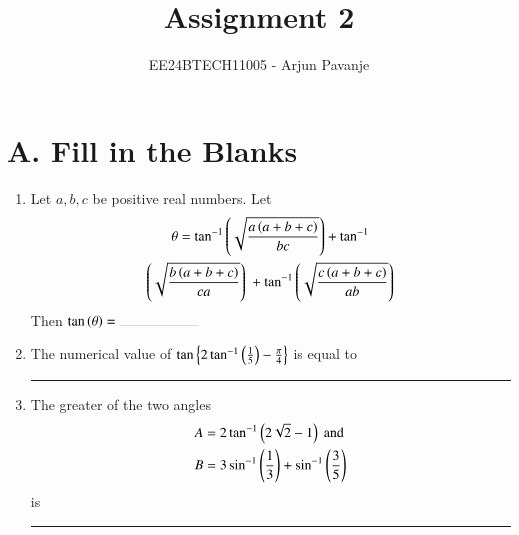 \documentclass[journal,12pt,twocolumn,article]{IEEEtran}
\theoremstyle{remark}
\begin{document}

\vspace{3cm}

\title{Assignment 2}
\author{EE24BTECH11005 - Arjun Pavanje}
\maketitle
\newpage
\bigskip

\renewcommand{\thefigure}{\theenumi}
\renewcommand{\thetable}{\theenumi}
\section*{A. Fill in the Blanks}
\begin{enumerate}
\item Let $a,b,c$ be positive real numbers. Let
\begin{multline*}
	\theta = \tan ^{-1}\left(\sqrt{\frac{a\left(a+b+c\right)}{bc}}\right) + \tan ^{-1}\\\left(\sqrt{\frac{b\left(a+b+c\right)}{ca}}\right)\ + \tan ^{-1}\left(\sqrt{\frac{c\left(a+b+c\right)}{ab}}\right) 
\end{multline*}
Then $\tan \brak{\theta}= \rule{2cm}{0.1pt}$ 
\hfill {}
\item The numerical value of $\tan \left\{ 2\tan ^{-1}\left(\frac{1}{5}\right)-\frac{\pi}{4}\right\}$ is equal to \rule{2cm}{0.1pt}
\hfill {}
\item The greater of the two angles 
\begin{align*}
A &= 2 \tan ^{-1}\left(2\sqrt{2}-1\right) \text{ and}\\
B &= 3\sin ^{-1}\left(\frac{1}{3}\right) + \sin ^{-1}\left(\frac{3}{5}\right)
\end{align*}
is \rule{2cm}{0.1pt}
\hfill {}
\end{enumerate}
\end{document}
